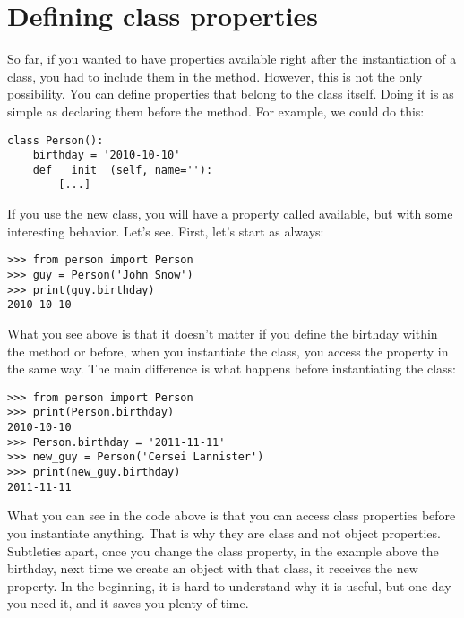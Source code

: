 
\section{Defining class properties}\label{sec:defining-class-properties}
So far, if you wanted to have properties available right after the instantiation of a class, you had to include them in the  method. However, this is not the only possibility. You can define properties that belong to the class itself. Doing it is as simple as declaring them before the  method. For example, we could do this:

\begin{verbatim}
class Person():
    birthday = '2010-10-10'
    def __init__(self, name=''):
        [...]
\end{verbatim}

If you use the new  class, you will have a property called  available, but with some interesting behavior. Let's see. First, let's start as always:

\begin{verbatim}
>>> from person import Person
>>> guy = Person('John Snow')
>>> print(guy.birthday)
2010-10-10
\end{verbatim}

What you see above is that it doesn't matter if you define the birthday within the  method or before, when you instantiate the class, you access the property in the same way. The main difference is what happens before instantiating the class:

\begin{verbatim}
>>> from person import Person
>>> print(Person.birthday)
2010-10-10
>>> Person.birthday = '2011-11-11'
>>> new_guy = Person('Cersei Lannister')
>>> print(new_guy.birthday)
2011-11-11
\end{verbatim}

What you can see in the code above is that you can access class properties before you instantiate anything. That is why they are class and not object properties. Subtleties apart, once you change the class property, in the example above the birthday, next time we create an object with that class, it receives the new property. In the beginning, it is hard to understand why it is useful, but one day you need it, and it saves you plenty of time.

